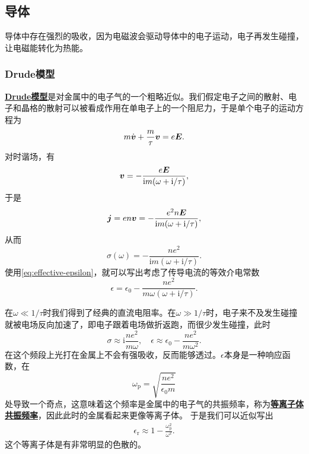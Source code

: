 \documentclass[UTF8, a4paper]{ctexart}
\newcommand*{\ii}{\mathrm{i}}
\newcommand*{\concept}[1]{\underline{\textbf{#1}}}
\begin{document}
\subsection{导体}

导体中存在强烈的吸收，因为电磁波会驱动导体中的电子运动，电子再发生碰撞，让电磁能转化为热能。

\subsubsection{Drude模型}

\concept{Drude模型}是对金属中的电子气的一个粗略近似。我们假定电子之间的散射、电子和晶格的散射可以被看成作用在单电子上的一个阻尼力，于是单个电子的运动方程为 %
\begin{equation}
    m \dot{\vb*{v}} + \frac{m}{\tau} \vb*{v} = e \vb*{E}.
\end{equation}
对时谐场，有
\begin{equation}
    \vb*{v} = - \frac{e \vb*{E}}{\ii m (\omega + \ii / \tau)},
\end{equation}
于是
\[
    \vb*{j} = e n \vb*{v} = - \frac{e^2 n \vb*{E}}{\ii m (\omega + \ii / \tau)},
\]
从而
\begin{equation}
    \sigma(\omega) = - \frac{n e^2}{\ii m (\omega + \ii / \tau)}.
\end{equation}
使用\eqref{eq:effective-epsilon}，就可以写出考虑了传导电流的等效介电常数
\begin{equation}
    \epsilon = \epsilon_0 - \frac{n e^2}{m \omega (\omega + \ii / \tau)}.
\end{equation}

在$\omega \ll 1/\tau$时我们得到了经典的直流电阻率。在$\omega \gg 1/\tau$时，电子来不及发生碰撞就被电场反向加速了，即电子跟着电场做折返跑，而很少发生碰撞，此时
\begin{equation}
    \sigma \approx \ii \frac{ne^2}{m \omega}, \quad \epsilon \approx \epsilon_0 - \frac{n e^2}{m \omega^2}.
\end{equation}
在这个频段上光打在金属上不会有强吸收，反而能够透过。$\epsilon$本身是一种响应函数，在
\begin{equation}
    \omega_\text{p} = \sqrt{\frac{ne^2}{\epsilon_0 m}}
\end{equation}
处导致一个奇点，这意味着这个频率是金属中的电子气的共振频率，称为\concept{等离子体共振频率}，因此此时的金属看起来更像等离子体。
于是我们可以近似写出
\begin{eqnarray}
    \epsilon_\text{r} \approx 1 - \frac{\omega_\text{p}^2}{\omega^2}.
\end{eqnarray}
这个等离子体是有非常明显的色散的。
\end{document}
